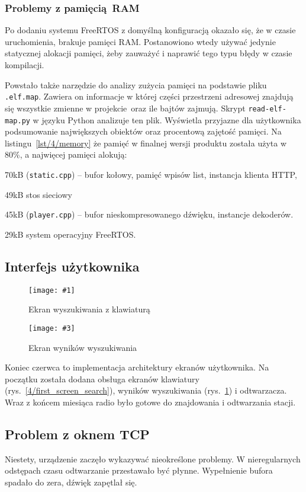 \documentclass[12pt]{report}
\let\tempone\itemize
\let\temptwo\enditemize
\renewenvironment{itemize}{\tempone\setlength{\itemsep}{0cm}}{\temptwo}
\newcommand{\imgintss}[5]{
	\begin{figure}[{#5}]
		\centering
		\begin{minipage}{.45\textwidth}
			\centering
			\texttt{[image: \#1]}
			\caption{#2}
			\label{#1}
		\end{minipage}%
		\hfill
		\begin{minipage}{.45\textwidth}
			\centering
			\texttt{[image: \#3]}
			\caption{#4}
			\label{#3}
		\end{minipage}
	\end{figure}
}
\newcommand{\imghss}[4]{\imgintss{#1}{#2}{#3}{#4}{H}}
\newcommand{\lstfile}[3]{
	\noindent
	\hspace{0.1\linewidth}
	\begin{minipage}{0.8\linewidth}
		
	\end{minipage}
	\vspace{0.3cm}
}
\begin{document}
			\subsubsection{Problemy z pamięcią RAM}
				Po dodaniu systemu FreeRTOS z domyślną konfiguracją okazało się, że w czasie uruchomienia, brakuje pamięci RAM.
				Postanowiono wtedy używać jedynie statycznej alokacji pamięci, żeby zauważyć i naprawić tego typu błędy w czasie kompilacji.

				\lstfile{default}{Zajętość pamięci RAM}{lst/4/memory}

				Powstało także narzędzie do analizy zużycia pamięci na podstawie pliku \lstinline|.elf.map|. Zawiera on informacje w której części przestrzeni adresowej znajdują się wszystkie zmienne w projekcie oraz ile bajtów zajmują. Skrypt \lstinline|read-elf-map.py| w języku Python analizuje ten plik. Wyświetla przyjazne dla użytkownika podsumowanie największych obiektów oraz procentową zajętość pamięci. Na listingu~\ref{lst/4/memory} że pamięć w finalnej wersji produktu została użyta w 80\%, a najwięcej pamięci alokują:
				\begin{itemize}
					\item 70kB (\lstinline|static.cpp|) -- bufor kołowy, pamięć wpisów list, instancja klienta HTTP,
					\item 49kB stos sieciowy
					\item 45kB (\lstinline|player.cpp|) -- bufor nieskompresowanego dźwięku, instancje dekoderów.
					\item 29kB system operacyjny FreeRTOS.
				\end{itemize}
			
		\subsection{Interfejs użytkownika}
			\imghss{4/first_screen_search}{Ekran wyszukiwania z klawiaturą}{4/first_screen_res}{Ekran wyników wyszukiwania}
		
			Koniec czerwca to implementacja architektury ekranów użytkownika. Na początku została dodana obsługa ekranów klawiatury (rys.~\ref{4/first_screen_search}), wyników wyszukiwania (rys.~\ref{4/first_screen_res}) i odtwarzacza. Wraz z końcem miesiąca radio było gotowe do znajdowania i odtwarzania stacji.
			
		\subsection{Problem z oknem TCP}
			Niestety, urządzenie zaczęło wykazywać nieokreślone problemy. W nieregularnych odstępach czasu odtwarzanie przestawało być płynne. Wypełnienie bufora spadało do zera, dźwięk zapętlał się.
			
\end{document}
